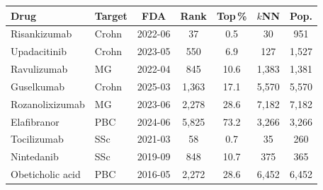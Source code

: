 \begin{tabular}{llccccc}
\toprule
Drug & Target & FDA & Rank & Top\,\% & $k$NN & Pop.\\
\midrule
Risankizumab & Crohn & 2022-06 & 37 & 0.5 & 30 & 951\\
Upadacitinib & Crohn & 2023-05 & 550 & 6.9 & 127 & 1,527\\
Ravulizumab & MG & 2022-04 & 845 & 10.6 & 1,383 & 1,381\\
Guselkumab & Crohn & 2025-03 & 1,363 & 17.1 & 5,570 & 5,570\\
Rozanolixizumab & MG & 2023-06 & 2,278 & 28.6 & 7,182 & 7,182\\
Elafibranor & PBC & 2024-06 & 5,825 & 73.2 & 3,266 & 3,266\\
\midrule
Tocilizumab & SSc & 2021-03 & 58 & 0.7 & 35 & 260\\
Nintedanib & SSc & 2019-09 & 848 & 10.7 & 375 & 365\\
Obeticholic acid & PBC & 2016-05 & 2,272 & 28.6 & 6,452 & 6,452\\
\bottomrule
\end{tabular}